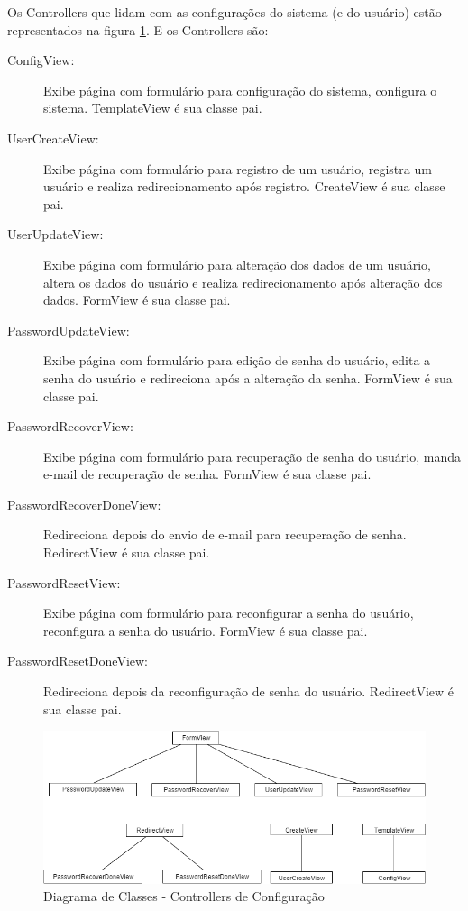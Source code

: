 Os Controllers que lidam com as configurações do sistema (e do usuário) estão representados na figura \ref{fig:diagrama-cont-configuration}. E os Controllers são:
\begin{description}
	\item[ConfigView:] Exibe página com formulário para configuração do sistema, configura o sistema. TemplateView é sua classe pai.
	\item[UserCreateView:] Exibe página com formulário para registro de um usuário, registra um usuário e realiza redirecionamento após registro. CreateView é sua classe pai.
	\item[UserUpdateView:] Exibe página com formulário para alteração dos dados de um usuário, altera os dados do usuário e realiza redirecionamento após alteração dos dados. FormView é sua classe pai.
	\item[PasswordUpdateView:] Exibe página com formulário para edição de senha do usuário, edita a senha do usuário e redireciona após a alteração da senha. FormView é sua classe pai.
	\item[PasswordRecoverView:] Exibe página com formulário para recuperação de senha do usuário, manda e-mail de recuperação de senha. FormView é sua classe pai.
	\item[PasswordRecoverDoneView:] Redireciona depois do envio de e-mail para recuperação de senha. RedirectView é sua classe pai.
	\item[PasswordResetView:] Exibe página com formulário para reconfigurar a senha do usuário, reconfigura a senha do usuário. FormView é sua classe pai.
	\item[PasswordResetDoneView:] Redireciona depois da reconfiguração de senha do usuário. RedirectView é sua classe pai.
\end{description} 

\begin{figure}[H]
\centering
\includegraphics[width=16cm,keepaspectratio]{figuras/diagrama_cont_configuration.png}
\caption{\label{fig:diagrama-cont-configuration} Diagrama de Classes - Controllers de Configuração}
\end{figure}

